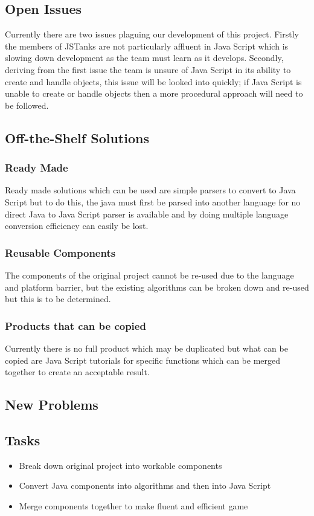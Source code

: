 \documentclass[12pt, titlepage]{article}
\begin{document}
\subsection{Open Issues}
Currently there are two issues plaguing our development of this project. Firstly
the members of JSTanks are not particularly affluent in Java Script which is
slowing down development as the team must learn as it develops. Secondly,
deriving from the first issue the team is unsure of Java Script in its ability
to create and handle objects, this issue will be looked into quickly; if Java
Script is unable to create or handle objects then a more procedural approach
will need to be followed.
\subsection{Off-the-Shelf Solutions}
\subsubsection{Ready Made}
Ready made solutions which can be used are simple parsers to convert to Java
Script but to do this, the java must first be parsed into another language for
no direct Java to Java Script parser is available and by doing multiple language
conversion efficiency can easily be lost.
\subsubsection{Reusable Components}
The components of the original project cannot be re-used due to the language and
platform barrier, but the existing algorithms can be broken down and re-used but
this is to be determined.
\subsubsection{Products that can be copied}
Currently there is no full product which may be duplicated but what can be
copied are Java Script tutorials for specific functions which can be merged
together to create an acceptable result.
\subsection{New Problems}
\subsection{Tasks}
\begin{itemize}
\item Break down original project into workable components
\item Convert Java components into algorithms and then into Java Script
\item Merge components together to make fluent and efficient game
\end{itemize}
\end{document}
